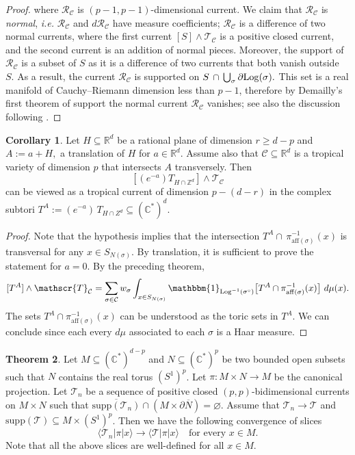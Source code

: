 \documentclass[11pt]{amsart}
\def\Log{{\rm Log}}
\theoremstyle{definition}
\newtheorem{theorem}{Theorem}[section]
\newtheorem{corollary}[theorem]{Corollary}
\newcommand{\R}{\mathbb{R}}
\newcommand{\Z}{\mathbb{Z}}
\newcommand{\lto}{\longrightarrow}
\newcommand{\C}{\mathbb{C}}
\newcommand{\cC}{\mathcal{C}}
\newcommand{\sT}{\mathscr{T}}
\newcommand{\sR}{\mathscr{R}}
\newcommand{\supp}[1]{{\mathrm{supp}(#1)}}
\begin{document}
\begin{proof}
where $\sR_{\cC}$ is $(p-1,p-1)$-dimensional current. We claim that $\sR_{\cC}$ is \emph{normal}, \textit{i.e.} $\sR_{\cC}$ and $d\sR_{\cC}$ have measure coefficients; $\sR_{\cC}$ is a difference of two normal currents, where the first current $[S] \wedge {\sT_{\cC}}$ is a positive closed current, and the second current is an addition of normal pieces. Moreover, the support of $\sR_{\cC}$ is a subset of $S$ as it is a difference of two currents that both vanish outside $S.$ As a result, the current $\sR_{\cC}$ is supported on $S\, \cap \, \bigcup_{\sigma} \partial \Log(\sigma) .$ This set is a real manifold of Cauchy--Riemann dimension less than $p-1$, therefore by Demailly's first theorem of support the normal current $\sR_{\cC}$ vanishes; see also the discussion following \cite[Proposition 4.11]{BH}.
\end{proof}


\begin{corollary}
Let $H \subseteq \R^d$ be a rational plane of dimension $r\geq d-p$ and $A:= a+ H,$ a translation of $H$ for $a \in \R^d.$ Assume also that  
$\cC \subseteq \R^d$ is a tropical variety of dimension $p$ that intersects $A$ transversely. Then 
$$
[(e^{-a})T_{H\cap \Z^d}] \wedge \sT_{\cC}
$$
can be viewed as a tropical current of dimension $p-(d-r)$ in the complex subtori $T^A:= (e^{-a})\, T_{H \cap Z^d}\subseteq (\C^*)^d.$
\end{corollary}
\begin{proof}
Note that the hypothesis implies that the intersection $T^A \cap \,\pi_{\mathrm{aff}(\sigma)}^{-1}(x)$ is transversal for any ${x \in S_{N(\sigma)}}.$  By translation, it is sufficient to prove the statement for $a=0.$ By the preceding theorem, 
$$
[T^A] \wedge \sT_{\cC} = \sum_{\sigma \in \cC} w_{\sigma}\int_{x \in S_{N(\sigma)}} \mathbbm{1}_{\Log^{-1}(\sigma^{\circ})} \big[ T^A \cap \pi_{\mathrm{aff}(\sigma)}^{-1}(x) \big] \ d\mu(x).
$$
The sets  $ T^A \cap \pi_{\mathrm{aff}(\sigma)}^{-1}(x)$ can be understood as the toric sets in $T^A$. We can conclude since each every $d\mu$ associated to each $\sigma$ is a Haar measure. 
\end{proof}





\begin{theorem}\label{thm:slicing}
Let $M \subseteq (\mathbb{C}^*)^{d-p}$ and $N \subseteq (\C^*)^{p}$ be two bounded open subsets such that $N$ contains the real torus $(S^1)^p$. Let $\pi : M \times N \lto M$ be the canonical projection. Let $\sT_n$ be a sequence of positive closed $(p, p)$-bidimensional currents on $M \times N$ such that $\overline{\supp{\sT_n}} \cap (M \times \partial \overline{N}) = \varnothing$. Assume that $\sT_n \lto \sT$ and $\supp{\sT} \subseteq M \times (S^1)^p$. Then we have the following convergence of slices
\[
\langle \sT_n | \pi| x\rangle \lto \langle \sT | \pi| x\rangle \quad \text{for every } x \in M.
\]
Note that all the above slices are well-defined for all $x \in M$.
\end{theorem}
\end{document}
